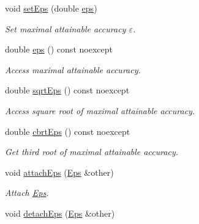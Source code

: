 \begin{DoxyCompactItemize}
void \hyperlink{classSpacy_1_1Mixin_1_1Eps_a1bbfd62541610d5d80f2782ab77158e4_a1bbfd62541610d5d80f2782ab77158e4}{set\+Eps} (double \hyperlink{classSpacy_1_1Mixin_1_1Eps_a40e2ba8f3abd2b5370ef41238cfaaf8b_a40e2ba8f3abd2b5370ef41238cfaaf8b}{eps})
\begin{DoxyCompactList}\small\item\em Set maximal attainable accuracy $\varepsilon$. \end{DoxyCompactList}\item 
double \hyperlink{classSpacy_1_1Mixin_1_1Eps_a40e2ba8f3abd2b5370ef41238cfaaf8b_a40e2ba8f3abd2b5370ef41238cfaaf8b}{eps} () const noexcept
\begin{DoxyCompactList}\small\item\em Access maximal attainable accuracy. \end{DoxyCompactList}\item 
double \hyperlink{classSpacy_1_1Mixin_1_1Eps_a29e8c25dc3f1fdede57b8eb06f520fe1_a29e8c25dc3f1fdede57b8eb06f520fe1}{sqrt\+Eps} () const noexcept
\begin{DoxyCompactList}\small\item\em Access square root of maximal attainable accuracy. \end{DoxyCompactList}\item 
double \hyperlink{classSpacy_1_1Mixin_1_1Eps_a1879ebbf1b467cb4be36bcc63307018d_a1879ebbf1b467cb4be36bcc63307018d}{cbrt\+Eps} () const noexcept
\begin{DoxyCompactList}\small\item\em Get third root of maximal attainable accuracy. \end{DoxyCompactList}\item 
void \hyperlink{classSpacy_1_1Mixin_1_1Eps_af69cd3dee52e723302b21ca2a25f1192_af69cd3dee52e723302b21ca2a25f1192}{attach\+Eps} (\hyperlink{classSpacy_1_1Mixin_1_1Eps_a51dbe0b9cc950e0f3dfd34a481f08ae4_a51dbe0b9cc950e0f3dfd34a481f08ae4}{Eps} \&other)
\begin{DoxyCompactList}\small\item\em Attach \hyperlink{classSpacy_1_1Mixin_1_1Eps}{Eps}. \end{DoxyCompactList}\item 
\hypertarget{classSpacy_1_1Mixin_1_1Eps_ab49910e189cb86b6fd6f89b6f2af14cc}{}void \hyperlink{classSpacy_1_1Mixin_1_1Eps_ab49910e189cb86b6fd6f89b6f2af14cc}{detach\+Eps} (\hyperlink{classSpacy_1_1Mixin_1_1Eps_a51dbe0b9cc950e0f3dfd34a481f08ae4_a51dbe0b9cc950e0f3dfd34a481f08ae4}{Eps} \&other)\label{classSpacy_1_1Mixin_1_1Eps_ab49910e189cb86b6fd6f89b6f2af14cc}


\end{DoxyCompactItemize}
